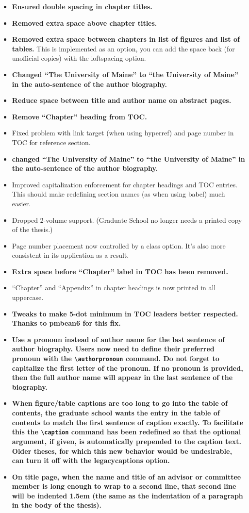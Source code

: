 \begin{itemize}
\item{\bfseries Ensured double spacing in chapter titles.}
\item{\bfseries Removed extra space above chapter titles.}
\item{{\bfseries Removed extra space between chapters in list of figures and list of tables.} This is implemented as an option, you can add the space back (for unofficial copies) with the loftspacing option.}
\item{\bfseries Changed ``The University of Maine'' to ``the University of Maine'' in the auto-sentence of the author biography.}
\item{\bfseries Reduce space between title and author name on abstract pages.}
\item{\bfseries Remove “Chapter” heading from TOC.}
\item{Fixed problem with link target (when using hyperref) and page number in TOC for reference section.}
\item{\bfseries changed ``The University of Maine'' to ``the University of Maine'' in the auto-sentence of the author biography.}
\item{Improved capitalization enforcement for chapter headings and TOC entries.  This should make redefining section names (as when using babel) much easier.}
\item{Dropped 2-volume support. (Graduate School no longer needs a printed copy of the thesis.)}
\item{Page number placement now controlled by a class option.  It's also more consistent in its application as a result.}
\item{\bfseries Extra space before ``Chapter'' label in TOC has been removed.}
\item{``Chapter'' and ``Appendix'' in chapter headings is now printed in all uppercase.}
\item{\bfseries Tweaks to make 5-dot minimum in TOC leaders better respected.  Thanks to pmbean6 for this fix.}
\item{\bfseries Use a pronoun instead of author name for the last sentence of author biography.  Users now need to define their preferred pronoun with the \verb=\authorpronoun= command.  Do not forget to capitalize the first letter of the pronoun.  If no pronoun is provided, then the full author name will appear in the last sentence of the biography.}
\item{\bfseries When figure/table captions are too long to go into the table of contents, the graduate school wants the entry in the table of contents to match the first sentence of caption exactly.  To facilitate this the \verb=\caption= command has been redefined so that the optional argument, if given, is automatically prepended to the caption text.  Older theses, for which this new behavior would be undesirable, can turn it off with the legacycaptions option.}
\item{\bfseries On title page, when the name and title of an advisor or committee member is long enough to wrap to a second line, that second line will be indented 1.5em (the same as the indentation of a paragraph in the body of the thesis).}
\end{itemize}

